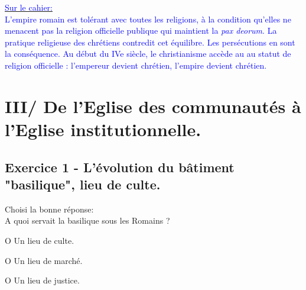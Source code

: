\documentclass{beamer}
\begin{document}
 \begin{frame} \underline{\textcolor{blue}{Sur le cahier:}} \\
\textcolor{blue}{L'empire romain est tolérant avec toutes les religions, à la condition qu'elles ne menacent pas la religion officielle publique qui maintient la \textit{pax deorum}. La pratique religieuse des chrétiens contredit cet équilibre. Les persécutions en sont la conséquence. Au début du IVe siècle, le christianisme accède au au statut de religion officielle : l'empereur devient chrétien, l'empire devient chrétien.}
 \end{frame}     
   
     \section{III/ De l'Eglise des communautés à l'Eglise institutionnelle.}
     
    \subsection{ Exercice 1 - L'évolution du bâtiment "basilique", lieu de culte.}
     
     \begin{frame}
      \begin{minipage}{7cm}
     Choisi la bonne réponse: \\
     A quoi servait la basilique sous les Romains ? \\
     \begin{minipage}{5cm}
     O Un lieu de culte.
     \end{minipage}
     \begin{minipage}{5cm}
     O Un lieu de marché.
     \end{minipage}
     \begin{minipage}{5cm}
     O Un lieu de justice. \\
     \end{minipage}
     \end{minipage}
     \end{frame}
     
\end{document}
